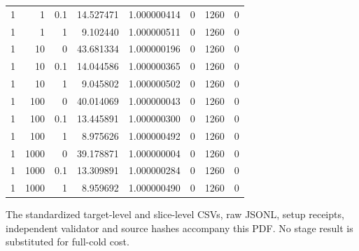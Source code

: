 \documentclass[10pt]{article}
\begin{document}
\begin{longtable}{rrrrrrrr}
1 & 1 & 0.1 & 14.527471 & 1.000000414 & 0 & 1260 & 0 \\
1 & 1 & 1 & 9.102440 & 1.000000511 & 0 & 1260 & 0 \\
1 & 10 & 0 & 43.681334 & 1.000000196 & 0 & 1260 & 0 \\
1 & 10 & 0.1 & 14.044586 & 1.000000365 & 0 & 1260 & 0 \\
1 & 10 & 1 & 9.045802 & 1.000000502 & 0 & 1260 & 0 \\
1 & 100 & 0 & 40.014069 & 1.000000043 & 0 & 1260 & 0 \\
1 & 100 & 0.1 & 13.445891 & 1.000000300 & 0 & 1260 & 0 \\
1 & 100 & 1 & 8.975626 & 1.000000492 & 0 & 1260 & 0 \\
1 & 1000 & 0 & 39.178871 & 1.000000004 & 0 & 1260 & 0 \\
1 & 1000 & 0.1 & 13.309891 & 1.000000284 & 0 & 1260 & 0 \\
1 & 1000 & 1 & 8.959692 & 1.000000490 & 0 & 1260 & 0 \\
\bottomrule\end{longtable}\normalsize
\noindent The standardized target-level and slice-level CSVs, raw JSONL, setup receipts, independent validator and source hashes accompany this PDF. No stage result is substituted for full-cold cost.
\end{document}
